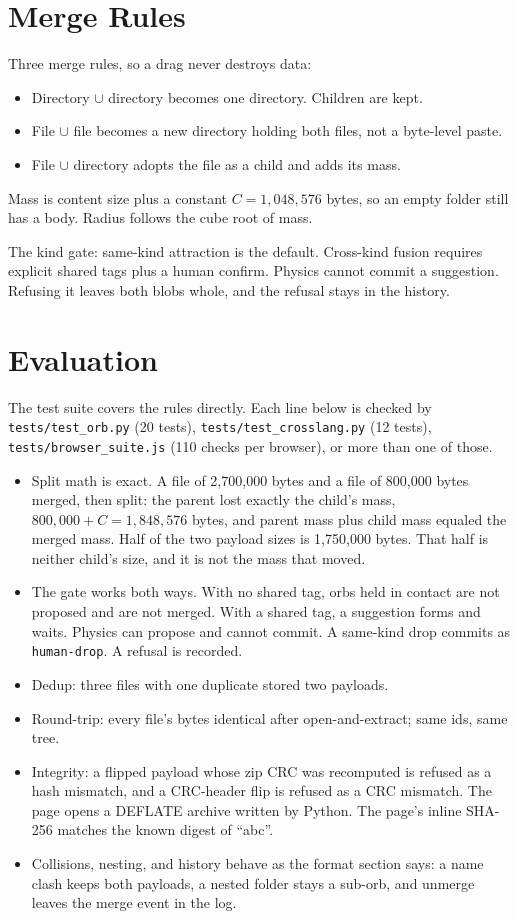 \documentclass[11pt]{article}
\begin{document}
\section{Merge Rules}

Three merge rules, so a drag never destroys data:
\begin{itemize}
  \item Directory $\cup$ directory becomes one directory. Children are kept.
  \item File $\cup$ file becomes a new directory holding both files, not a byte-level paste.
  \item File $\cup$ directory adopts the file as a child and adds its mass.
\end{itemize}
Mass is content size plus a constant $C = 1{,}048{,}576$ bytes, so an empty folder still has a body.
Radius follows the cube root of mass.

The kind gate: same-kind attraction is the default.
Cross-kind fusion requires explicit shared tags plus a human confirm.
Physics cannot commit a suggestion.
Refusing it leaves both blobs whole, and the refusal stays in the history.

\section{Evaluation}

The test suite covers the rules directly.
Each line below is checked by \texttt{tests/test\_orb.py} (20 tests), \texttt{tests/test\_crosslang.py} (12 tests), \texttt{tests/browser\_suite.js} (110 checks per browser), or more than one of those.
\begin{itemize}
  \item Split math is exact. A file of 2,700,000 bytes and a file of 800,000 bytes merged, then split: the parent lost exactly the child's mass, $800{,}000 + C = 1{,}848{,}576$ bytes, and parent mass plus child mass equaled the merged mass. Half of the two payload sizes is 1,750,000 bytes. That half is neither child's size, and it is not the mass that moved.
  \item The gate works both ways. With no shared tag, orbs held in contact are not proposed and are not merged. With a shared tag, a suggestion forms and waits. Physics can propose and cannot commit. A same-kind drop commits as \texttt{human-drop}. A refusal is recorded.
  \item Dedup: three files with one duplicate stored two payloads.
  \item Round-trip: every file's bytes identical after open-and-extract; same ids, same tree.
  \item Integrity: a flipped payload whose zip CRC was recomputed is refused as a hash mismatch, and a CRC-header flip is refused as a CRC mismatch. The page opens a DEFLATE archive written by Python. The page's inline SHA-256 matches the known digest of ``abc''.
  \item Collisions, nesting, and history behave as the format section says: a name clash keeps both payloads, a nested folder stays a sub-orb, and unmerge leaves the merge event in the log.
\end{itemize}
\end{document}

